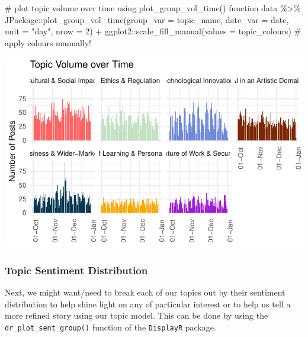 \documentclass[
  letterpaper,
  DIV=11,
  numbers=noendperiod]{scrreprt}
\newenvironment{Shaded}{\begin{snugshade}}{\end{snugshade}}
\newcommand{\AttributeTok}[1]{\textcolor[rgb]{0.40,0.45,0.13}{#1}}
\newcommand{\CommentTok}[1]{\textcolor[rgb]{0.37,0.37,0.37}{#1}}
\newcommand{\DecValTok}[1]{\textcolor[rgb]{0.68,0.00,0.00}{#1}}
\newcommand{\FunctionTok}[1]{\textcolor[rgb]{0.28,0.35,0.67}{#1}}
\newcommand{\NormalTok}[1]{\textcolor[rgb]{0.00,0.23,0.31}{#1}}
\newcommand{\SpecialCharTok}[1]{\textcolor[rgb]{0.37,0.37,0.37}{#1}}
\newcommand{\StringTok}[1]{\textcolor[rgb]{0.13,0.47,0.30}{#1}}
\begin{document}
\begin{Shaded}
\begin{Highlighting}[]
\CommentTok{\# plot topic volume over time using \textquotesingle{}plot\_group\_vol\_time()\textquotesingle{} function}
\NormalTok{data }\SpecialCharTok{\%\textgreater{}\%} 
\NormalTok{  JPackage}\SpecialCharTok{::}\FunctionTok{plot\_group\_vol\_time}\NormalTok{(}\AttributeTok{group\_var =}\NormalTok{ topic\_name,}
                                \AttributeTok{date\_var =}\NormalTok{ date,}
                                \AttributeTok{unit =} \StringTok{"day"}\NormalTok{,}
                                \AttributeTok{nrow =} \DecValTok{2}\NormalTok{) }\SpecialCharTok{+}
\NormalTok{  ggplot2}\SpecialCharTok{::}\FunctionTok{scale\_fill\_manual}\NormalTok{(}\AttributeTok{values =}\NormalTok{ topic\_colours) }\CommentTok{\# apply colours manually!}
\end{Highlighting}
\end{Shaded}

\includegraphics{quarto_docs/conversation_landscape_files/figure-pdf/unnamed-chunk-7-1.pdf}

\subsubsection{Topic Sentiment
Distribution}\label{topic-sentiment-distribution}

Next, we might want/need to break each of our topics out by their
sentiment distribution to help shine light on any of particular interest
or to help us tell a more refined story using our topic model. This can
be done by using the \texttt{dr\_plot\_sent\_group()} function of the
\texttt{DisplayR} package.
\end{document}
